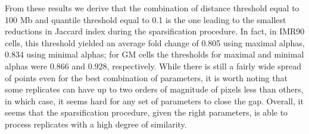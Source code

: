 From these results we derive that the combination of distance threshold equal to 100 Mb and quantile threshold equal to 0.1 is the one leading to the smallest reductions in Jaccard index during the sparsification procedure. In fact, in IMR90 cells, this threshold yielded an average fold change of 0.805 using maximal alphas, 0.834 using minimal alphas; for GM cells the thresholds for maximal and minimal alphas were 0.866 and 0.928, respectively. While there is still a fairly wide spread of points even for the best combination of parameters, it is worth noting that some replicates can have up to two orders of magnitude of pixels less than others, in which case, it seems hard for any set of parameters to close the gap. Overall, it seems that the sparsification procedure, given the right parameters, is able to process replicates with a high degree of similarity.







